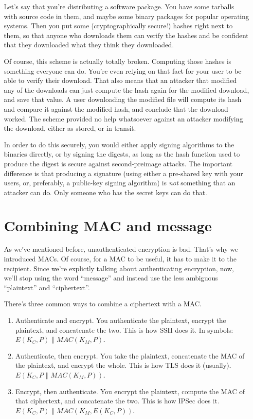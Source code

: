 \documentclass[11pt,ebook,table,dvipsnames]{memoir}
\begin{document}
Let's say that you're distributing a software package. You have some
tarballs with source code in them, and maybe some binary packages for
popular operating systems. Then you put some (cryptographically
secure!) hashes right next to them, so that anyone who downloads them
can verify the hashes and be confident that they downloaded what they
think they downloaded.

Of course, this scheme is actually totally broken. Computing those
hashes is something everyone can do. You're even relying on that fact
for your user to be able to verify their download. That also means
that an attacker that modified any of the downloads can just compute
the hash again for the modified download, and save that value. A user
downloading the modified file will compute its hash and compare it
against the modified hash, and conclude that the download worked. The
scheme provided no help whatsoever against an attacker modifying the
download, either as stored, or in transit.

In order to do this securely, you would either apply signing
algorithms to the binaries directly, or by signing the digests, as
long as the hash function used to produce the digest is secure against
second-preimage attacks. The important difference is that producing a
signature (using either a pre-shared key with your users, or,
preferably, a public-key signing algorithm) is \emph{not} something that an
attacker can do. Only someone who has the secret keys can do that.
\section{Combining MAC and message}
\label{sec-2-7-2}

As we've mentioned before, unauthenticated encryption is bad. That's
why we introduced MACs. Of course, for a MAC to be useful, it has to
make it to the recipient. Since we're explictly talking about
authenticating encryption, now, we'll stop using the word \enquote{message}
and instead use the less ambiguous \enquote{plaintext} and \enquote{ciphertext}.

There's three common ways to combine a ciphertext with a MAC.

\begin{enumerate}
\item Authenticate and encrypt. You authenticate the plaintext, encrypt
the plaintext, and concatenate the two. This is how SSH does it. In
symbols: $E(K_{C}, P) \| MAC(K_{M}, P)$.
\item Authenticate, then encrypt. You take the plaintext, concatenate the
MAC of the plaintext, and encrypt the whole. This is how TLS does
it (usually). $E(K_C, P \| MAC(K_M, P))$.
\item Encrypt, then authenticate. You encrypt the plaintext, compute the
MAC of that ciphertext, and concatenate the two. This is how IPSec
does it. $E(K_C, P) \| MAC(K_M, E(K_C, P))$.
\end{enumerate}
\end{document}
